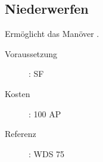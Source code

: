\subsection{Niederwerfen}
\label{sf.niederwerfen}
Ermöglicht das Manöver .
\begin{description}
    \item[Voraussetzung]:
        SF 
    \item [Kosten]:
        100 AP
    \item [Referenz]:
        WDS 75
\end{description}

